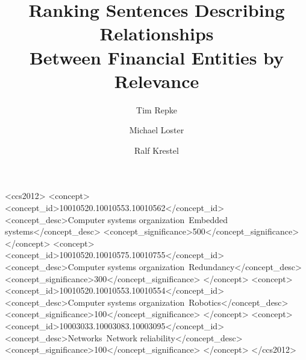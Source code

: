 \documentclass[
	format=sigconf,
	review=false]{acmart}
\title{Ranking Sentences Describing Relationships\\ Between Financial Entities by Relevance}
\author{Tim Repke}
\affiliation{%
	\institution{Hasso Plattner Institute}
	\city{Potsdam}
	\country{Germany}
}
\author{Michael Loster}
\affiliation{%
	\institution{Hasso Plattner Institute}
	\city{Potsdam}
	\country{Germany}
}
\author{Ralf Krestel}
\affiliation{%
	\institution{Hasso Plattner Institute}
	\city{Potsdam}
	\country{Germany}
}
\begin{document}

%
%
\begin{CCSXML}
<ccs2012>
 <concept>
  <concept_id>10010520.10010553.10010562</concept_id>
  <concept_desc>Computer systems organization~Embedded systems</concept_desc>
  <concept_significance>500</concept_significance>
 </concept>
 <concept>
  <concept_id>10010520.10010575.10010755</concept_id>
  <concept_desc>Computer systems organization~Redundancy</concept_desc>
  <concept_significance>300</concept_significance>
 </concept>
 <concept>
  <concept_id>10010520.10010553.10010554</concept_id>
  <concept_desc>Computer systems organization~Robotics</concept_desc>
  <concept_significance>100</concept_significance>
 </concept>
 <concept>
  <concept_id>10003033.10003083.10003095</concept_id>
  <concept_desc>Networks~Network reliability</concept_desc>
  <concept_significance>100</concept_significance>
 </concept>
</ccs2012>  
\end{CCSXML}





\maketitle




 
\end{document}
